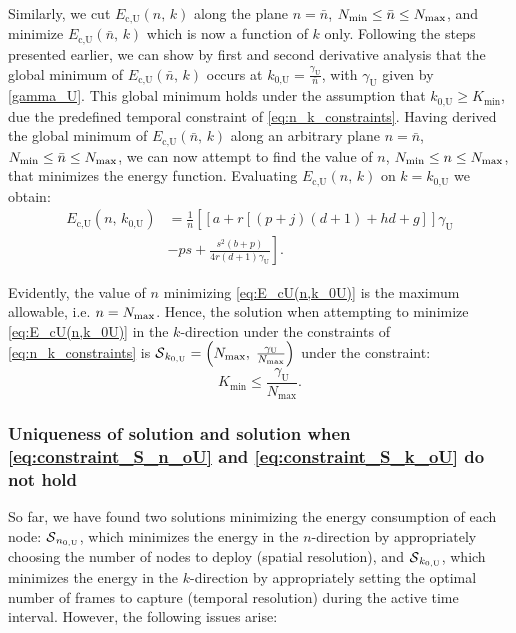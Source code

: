 \documentclass[twocolumn,english]{IEEEtran}
\theoremstyle{plain}
\theoremstyle{definition}
\begin{document}
Similarly, we cut $E_{\text{c,U}}(n,\, k)$ along the plane $n=\bar{n}$,
$N_{\textnormal{min}}\le\bar{n}\le N_{\textnormal{max}}$, and minimize
$E_{\text{c,U}}(\bar{n},\, k)$ which is now a function of $k$ only.
Following the steps presented earlier, we can show by first and second
derivative analysis that the global minimum of $E_{\text{c,U}}(\bar{n},\, k)$
occurs at $k_{\text{0,U}}=\frac{\gamma_{\textrm{U}}}{\bar{n}}$, with
$\gamma_{\text{U}}$ given by \eqref{gamma_U}. This global minimum
holds under the assumption that $k_{\text{0,U}}\geq K_{\min}$, due
the predefined temporal constraint of \eqref{eq:n_k_constraints}.
Having derived the global minimum of $E_{\text{c,U}}(\bar{n},\, k)$
along an arbitrary plane $n=\bar{n}$, $N_{\textnormal{min}}\le\bar{n}\le N_{\textnormal{max}}$,
we can now attempt to find the value of $n$, $N_{\textnormal{min}}\le n\le N_{\textnormal{max}}$,
that minimizes the energy function. Evaluating $E_{\text{c,U}}(n,\, k)$
on $k=k_{\text{0,U}}$ we obtain:{} 
\begin{align}
E_{\text{c,U}}(n,\, k_{\text{0,U}}) & =\frac{1}{n}\left[\left[a+r\left[\left(p+j\right)\left(d+1\right)+hd+g\right]\right]\gamma_{\textrm{U}}\right.\label{eq:E_cU(n,k_0U)}\\
 & \left.-ps+\frac{s^{2}(b+p)}{4r(d+1)\gamma_{\textrm{U}}}\right].\nonumber 
\end{align}


\noindent Evidently, the value of $n$ minimizing \eqref{eq:E_cU(n,k_0U)}
is the maximum allowable, i.e. $n=N_{\textnormal{max}}$. Hence, the
solution when attempting to minimize \eqref{eq:E_cU(n,k_0U)} in the
$k$-direction under the constraints of \eqref{eq:n_k_constraints}
is $\text{\ensuremath{\mathcal{S}}}_{k_{0,\text{U}}}=\left(N_{\text{max}},\;\frac{\gamma_{\textrm{U}}}{N_{\text{max}}}\right)$
under the constraint: 
\begin{equation}
K_{\min}\leq\frac{\gamma_{\textrm{U}}}{N_{\text{max}}}.\label{eq:constraint_S_k_oU}
\end{equation}



\subsubsection{Uniqueness of solution and solution when \eqref{eq:constraint_S_n_oU}
and \eqref{eq:constraint_S_k_oU} do not hold}

So far, we have found two solutions minimizing the energy consumption
of each node: $\text{\ensuremath{\mathcal{S}}}_{n_{0,\text{U}}}$,
which minimizes the energy in the $n$-direction by appropriately
choosing the number of nodes to deploy (spatial resolution), and $\text{\ensuremath{\mathcal{S}}}_{k_{0,\text{U}}}$,
which minimizes the energy in the $k$-direction by appropriately
setting the optimal number of frames to capture (temporal resolution)
during the active time interval. However, the following issues arise: 
\end{document}
